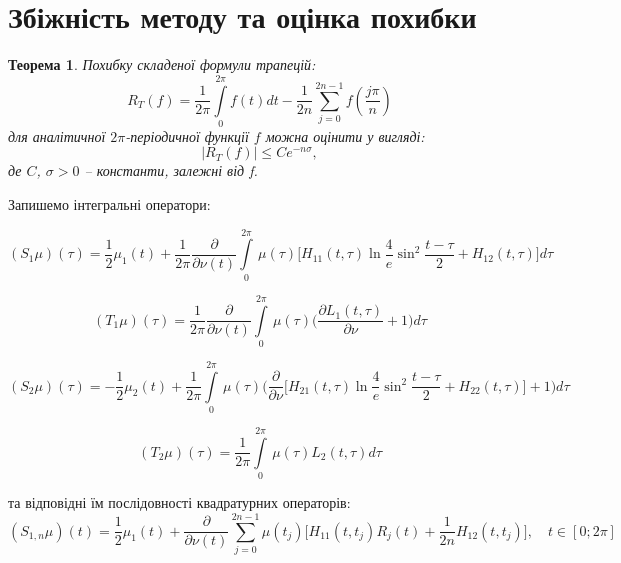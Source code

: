 \documentclass[a4 paper,12pt,ukrainian]{report}
\newtheorem{theorem}{\textbf{Теорема}}[chapter]
\begin{document}
\section*{Збіжність методу та оцінка похибки}
\begin{theorem}\cite{Kress}
Похибку складеної формули трапецій:
\begin{equation*}
R_{T}(f)=\frac{1}{2\pi}\int\limits_{0}^{2\pi}f(t)dt-\frac{1}{2n}\sum\limits_{j=0}^{2n-1}f(\frac{j\pi}{n})
\end{equation*}
для аналітичної $2\pi$-періодичної функції $f$ можна оцінити у вигляді:
\begin{equation*}
|R_{T}(f)|\le Ce^{-n\sigma},
\end{equation*}
де $C$, $\sigma>0$ -- константи, залежні від f. 
\end{theorem}
\hspace*{\parindent}Запишемо інтегральні оператори:

\begin{equation*}
(S_{1}\mu)(\tau)=\frac{1}{2}\mu_1(t) + \frac{1}{2\pi}\frac{\partial}{\partial\nu(t)}\int\limits_{0}^{2\pi} \,\mu(\tau)\Big[H_{11}(t,\tau)\ln{\frac{4}{e}\sin^2\frac{t-\tau}{2}}+H_{12}(t,\tau)\Big]d\tau
\end{equation*}

\begin{equation*}
(T_{1}\mu)(\tau)=\frac{1}{2\pi}\frac{\partial}{\partial\nu(t)}\int\limits_{0}^{2\pi} \,\mu(\tau)\bigg(\frac{\partial L_{1}(t,\tau)}{\partial \nu} + 1\bigg)d\tau
\end{equation*}

\begin{equation*}
(S_{2}\mu)(\tau)=-\frac{1}{2}\mu_2(t) + \frac{1}{2\pi}\int\limits_{0}^{2\pi} \,\mu(\tau)\bigg(\frac{\partial}{\partial\nu}\Big[H_{21}(t,\tau)\ln{\frac{4}{e}\sin^2\frac{t-\tau}{2}}+H_{22}(t,\tau)\Big] + 1\bigg)d\tau
\end{equation*}

\begin{equation*}
(T_{2}\mu)(\tau)=\frac{1}{2\pi}\int\limits_{0}^{2\pi} \,\mu(\tau)L_{2}(t,\tau)d\tau
\end{equation*}


та відповідні їм послідовності квадратурних операторів:
\begin{equation*}
(S_{1,n}\mu)(t)=\frac{1}{2}\mu_1(t)+\frac{\partial}{\partial\nu(t)}\sum\limits_{j=0}^{2n-1} \mu(t_{j})\Big[H_{11}(t,t_j)R_j(t)+\frac{1}{2n}H_{12}(t,t_j)\Big], \quad t\in[0;2\pi]
\end{equation*}
\end{document}
